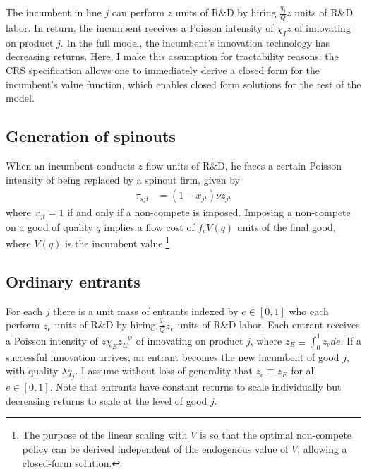 \documentclass[12pt,english]{article}
\theoremstyle{remark}
\begin{document}
The incumbent in line $j$ can perform $z$ units of R\&D by hiring $\frac{q_j}{Q}z$ units of R\&D labor. In return, the incumbent receives a Poisson intensity of $\chi_I z$ of innovating on product $j$. In the full model, the incumbent's innovation technology has decreasing returns. Here, I make this assumption for tractability reasons: the CRS specification allows one to immediately derive a closed form for the incumbent's value function, which enables closed form solutions for the rest of the model. 

\subsection{Generation of spinouts}

When an incumbent conducts $z$ flow units of R\&D, he faces a certain Poisson intensity of being replaced by a spinout firm, given by 
\begin{align*}
	\tau_{sjt} &= (1-x_{jt}) \nu z_{jt}
\end{align*} 
where $x_{jt} = 1$ if and only if a non-compete is imposed. Imposing a non-compete on a good of quality $q$ implies a flow cost of $f_c V(q)$ units of the final good, where $V(q)$ is the incumbent value.\footnote{The purpose of the linear scaling with $V$ is so that the optimal non-compete policy can be derived independent of the endogenous value of $V$, allowing a closed-form solution.}

\subsection{Ordinary entrants}

For each $j$ there is a unit mass of entrants indexed by $e \in [0,1]$ who each perform $z_e$ units of R\&D by hiring $\frac{q_j}{Q} z_e$ units of R\&D labor. Each entrant receives a Poisson intensity of $z \chi_E z_E^{-\psi}$ of innovating on product $j$, where $z_E \equiv \int_0^1 z_e de$. If a successful innovation arrives, an entrant becomes the new incumbent of good $j$, with quality $\lambda q_j$. I assume without loss of generality that $z_e \equiv z_E$ for all $e \in [0,1]$. Note that entrants have constant returns to scale individually but decreasing returns to scale at the level of good $j$. 
\end{document}
